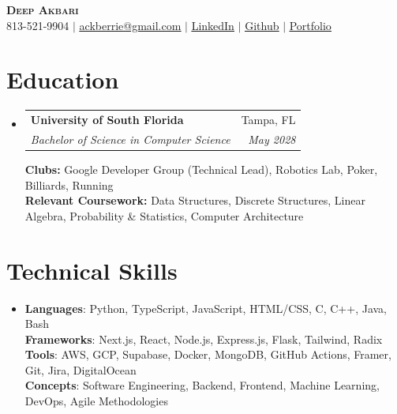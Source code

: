 \documentclass[letterpaper,11pt]{article}
\makeatletter
\newcommand{\resumeSubheading}[4]{
  \vspace{-2pt}\item
    \begin{tabular*}{0.97\textwidth}[t]{l@{\extracolsep{\fill}}r}
      \textbf{#1} & #2 \\
      \textit{\small#3} & \textit{\small #4} \\
    \end{tabular*}\vspace{-7pt}
}
\newcommand{\resumeSubHeadingListStart}{\begin{itemize}[leftmargin=0.15in, label={}]}
\newcommand{\resumeSubHeadingListEnd}{\end{itemize}}
\makeatother
\begin{document}

\begin{center}
    \textbf{\Huge \scshape Deep Akbari} \\ \vspace{1pt}
    \small 813-521-9904 $|$ \href{mailto:ackberrie@gmail.com}{\underline{ackberrie@gmail.com}} $|$ 
    \href{https://www.linkedin.com/in/deep-akbari/}{\underline{LinkedIn}} $|$
    \href{https://github.com/ackberry}{\underline{Github}} $|$
    \href{https://ackberry.club/}{\underline{Portfolio}}
\end{center}


\section{Education}
  \resumeSubHeadingListStart
    \resumeSubheading
      {University of South Florida}{Tampa, FL}
      {Bachelor of Science in Computer Science}{May 2028}

      \vspace{0.7em}
      \textbf{Clubs:} Google Developer Group (Technical Lead), Robotics Lab, Poker, Billiards, Running \\
      \textbf{Relevant Coursework:} Data Structures, Discrete Structures, Linear Algebra, Probability \& Statistics, Computer Architecture
  \resumeSubHeadingListEnd

\section{Technical Skills}
\resumeSubHeadingListStart
  \item \small{
    \textbf{Languages}: Python, TypeScript, JavaScript, HTML/CSS, C, C++, Java, Bash \\
    \textbf{Frameworks}: Next.js, React, Node.js, Express.js, Flask, Tailwind, Radix \\
    \textbf{Tools}: AWS, GCP, Supabase, Docker, MongoDB, GitHub Actions, Framer, Git, Jira, DigitalOcean \\
    \textbf{Concepts}: Software Engineering, Backend, Frontend, Machine Learning, DevOps, Agile Methodologies
  }
\resumeSubHeadingListEnd
\end{document}
